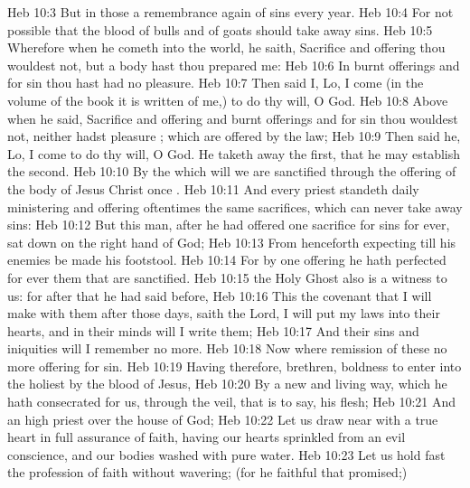 \vs Heb 10:3 But in those  a remembrance again  of sins every year.
\vs Heb 10:4 For  not possible that the blood of bulls and of goats should take away sins.
\vs Heb 10:5 Wherefore when he cometh into the world, he saith, Sacrifice and offering thou wouldest not, but a body hast thou prepared me:
\vs Heb 10:6 In burnt offerings and  for sin thou hast had no pleasure.
\vs Heb 10:7 Then said I, Lo, I come (in the volume of the book it is written of me,) to do thy will, O God.
\vs Heb 10:8 Above when he said, Sacrifice and offering and burnt offerings and  for sin thou wouldest not, neither hadst pleasure ; which are offered by the law;
\vs Heb 10:9 Then said he, Lo, I come to do thy will, O God. He taketh away the first, that he may establish the second.
\vs Heb 10:10 By the which will we are sanctified through the offering of the body of Jesus Christ once .
\vs Heb 10:11 And every priest standeth daily ministering and offering oftentimes the same sacrifices, which can never take away sins:
\vs Heb 10:12 But this man, after he had offered one sacrifice for sins for ever, sat down on the right hand of God;
\vs Heb 10:13 From henceforth expecting till his enemies be made his footstool.
\vs Heb 10:14 For by one offering he hath perfected for ever them that are sanctified.
\vs Heb 10:15  the Holy Ghost also is a witness to us: for after that he had said before,
\vs Heb 10:16 This  the covenant that I will make with them after those days, saith the Lord, I will put my laws into their hearts, and in their minds will I write them;
\vs Heb 10:17 And their sins and iniquities will I remember no more.
\vs Heb 10:18 Now where remission of these  no more offering for sin.
\vs Heb 10:19 Having therefore, brethren, boldness to enter into the holiest by the blood of Jesus,
\vs Heb 10:20 By a new and living way, which he hath consecrated for us, through the veil, that is to say, his flesh;
\vs Heb 10:21 And  an high priest over the house of God;
\vs Heb 10:22 Let us draw near with a true heart in full assurance of faith, having our hearts sprinkled from an evil conscience, and our bodies washed with pure water.
\vs Heb 10:23 Let us hold fast the profession of  faith without wavering; (for he  faithful that promised;)
